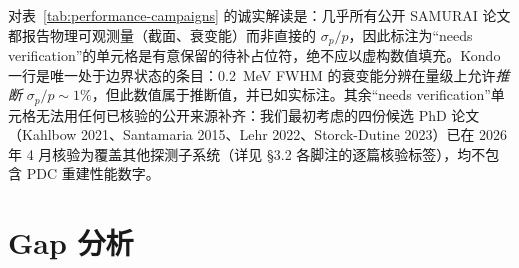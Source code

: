 \documentclass[a4paper, 11pt]{article}
\begin{document}
对表~\ref{tab:performance-campaigns} 的诚实解读是：几乎所有公开 SAMURAI 论文都报告物理可观测量（截面、衰变能）而非直接的 $\sigma_p/p$，因此标注为“needs verification”的单元格是有意保留的待补占位符，绝不应以虚构数值填充。Kondo 一行是唯一处于边界状态的条目：0.2~MeV FWHM 的衰变能分辨在量级上允许\emph{推断} $\sigma_p/p \sim 1\%$，但此数值属于推断值，并已如实标注。其余“needs verification”单元格无法用任何已核验的公开来源补齐：我们最初考虑的四份候选 PhD 论文（Kahlbow 2021、Santamaria 2015、Lehr 2022、Storck-Dutine 2023）已在 2026 年 4 月核验为覆盖其他探测子系统（详见 §3.2 各脚注的逐篇核验标签），均不包含 PDC 重建性能数字。

\section{Gap 分析}
\end{document}
